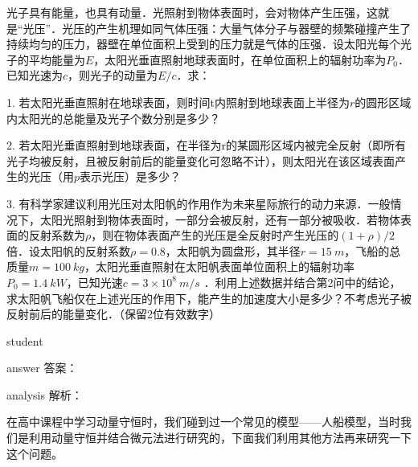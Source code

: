 \begin{example}
	光子具有能量，也具有动量．光照射到物体表面时，会对物体产生压强，这就是“光压”．光压的产生机理如同气体压强：大量气体分子与器壁的频繁碰撞产生了持续均匀的压力，器壁在单位面积上受到的压力就是气体的压强．设太阳光每个光子的平均能量为$ E $，太阳光垂直照射地球表面时，在单位面积上的辐射功率为$ P_0 $．已知光速为$ c $，则光子的动量为$ E/c $．求：
	
	1. 若太阳光垂直照射在地球表面，则时间t内照射到地球表面上半径为$ r $的圆形区域内太阳光的总能量及光子个数分别是多少？
	
	
	2. 若太阳光垂直照射到地球表面，在半径为r的某圆形区域内被完全反射（即所有光子均被反射，且被反射前后的能量变化可忽略不计），则太阳光在该区域表面产生的光压（用$ p $表示光压）是多少？
	
	
	3. 有科学家建议利用光压对太阳帆的作用作为未来星际旅行的动力来源．一般情况下，太阳光照射到物体表面时，一部分会被反射，还有一部分被吸收．若物体表面的反射系数为$ \rho $，则在物体表面产生的光压是全反射时产生光压的$ (1+\rho)/2 $倍．设太阳帆的反射系数$ \rho=0.8 $，太阳帆为圆盘形，其半径$ r=15~\si{m} $，飞船的总质量$ m=100~\si{kg} $，太阳光垂直照射在太阳帆表面单位面积上的辐射功率$ P_0=1.4~\si{kW} $，已知光速$ c=3\times 10^8~\si{m/s} $ ．利用上述数据并结合第2问中的结论，求太阳帆飞船仅在上述光压的作用下，能产生的加速度大小是多少？不考虑光子被反射前后的能量变化．（保留2位有效数字）
	
	
	
	\begin{taggedblock}{student}
		\vspace*{2cm}
	\end{taggedblock}
	
	
	\begin{taggedblock}{answer}
		答案：
	\end{taggedblock}
	
	
	\begin{taggedblock}{analysis}
		解析：
	\end{taggedblock}
\end{example}


在高中课程中学习动量守恒时，我们碰到过一个常见的模型——人船模型，当时我们是利用动量守恒并结合微元法进行研究的，下面我们利用其他方法再来研究一下这个问题。

